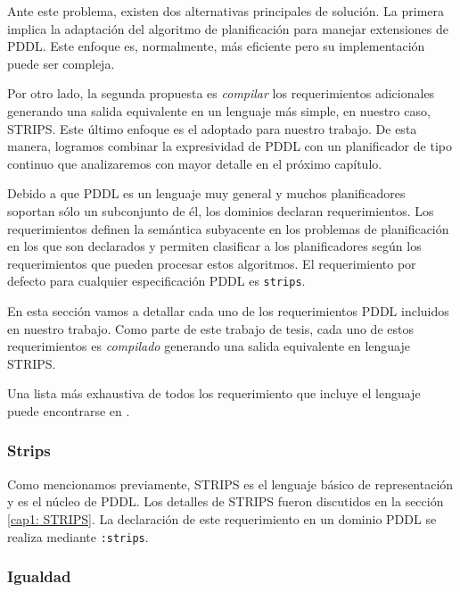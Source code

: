 	Ante este problema, existen dos alternativas principales de soluci\'on. La primera implica la 
	adaptaci\'on del algoritmo de planificaci\'on para manejar extensiones
	de PDDL. Este enfoque es, normalmente, m\'as eficiente pero su implementaci\'on puede
	ser compleja.
	
	Por otro lado, la segunda propuesta es \emph{compilar}
        los requerimientos adicionales
	generando una salida equivalente en un lenguaje m\'as simple, en nuestro caso, 
	STRIPS. Este \'ultimo enfoque es el adoptado para nuestro
        trabajo. De esta manera, logramos combinar la expresividad de
        PDDL con un planificador de tipo continuo que
        analizaremos con mayor detalle en el pr\'oximo cap\'itulo.

        Debido a que PDDL es un lenguaje muy general y muchos planificadores
	soportan s\'olo un subconjunto de \'el, los dominios declaran requerimientos.
	Los requerimientos definen la sem\'antica subyacente en los problemas de 
	planificaci\'on en los que son declarados y permiten clasificar a los
	planificadores seg\'un los requerimientos que pueden procesar estos
	algoritmos. El requerimiento por defecto para cualquier especificaci\'on
	PDDL es \texttt{strips}.
	
	En esta secci\'on vamos a detallar cada uno de los requerimientos
	PDDL incluidos en nuestro trabajo. 
        Como parte de este trabajo de tesis, cada uno de estos
        requerimientos es \emph{compilado} 
        generando una salida equivalente en lenguaje STRIPS.
        
        Una lista m\'as exhaustiva de todos los requerimiento que incluye el lenguaje
	puede encontrarse en \cite{gbraun:pddl31}.



	\subsubsection{Strips}
	
	Como mencionamos previamente, STRIPS
	es el lenguaje b\'asico de representaci\'on y es el n\'ucleo de PDDL.
	Los detalles de STRIPS fueron discutidos en la secci\'on \ref{cap1: STRIPS}.
	La declaraci\'on de este requerimiento en un dominio PDDL se
        realiza mediante \texttt{:strips}. 

	\subsubsection{Igualdad}
	
